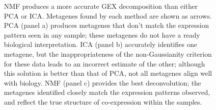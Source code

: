 \documentclass[dissertation.tex]{subfiles}
\begin{document}
\begin{figure}
  \centering
  \caption[Comparison of \acrshort{GEX} deconvolution techniques on synthetic data]{\gls{NMF} produces a more accurate \gls{GEX} decomposition than either \gls{PCA} or \gls{ICA}.  Metagenes found by each method are shown as arrows.  \gls{PCA} (panel a) produces metagenes that don't match the expression pattern seen in any sample; these metagenes do not have a ready biological interpretation.  \gls{ICA} (panel b) accurately identifies one metagene, but the inappropriateness of the non-Gaussianity criterion for these data leads to an incorrect estimate of the other; although this solution is better than that of \gls{PCA}, not all metagenes align well with biology.  \gls{NMF} (panel c) provides the best deconvolution; the metagenes identified closely match the expression patterns observed, and reflect the true structure of co-expression within the samples.}\label{fig:sigs-example-matrixfactor-methods}
\end{figure}
\end{document}
